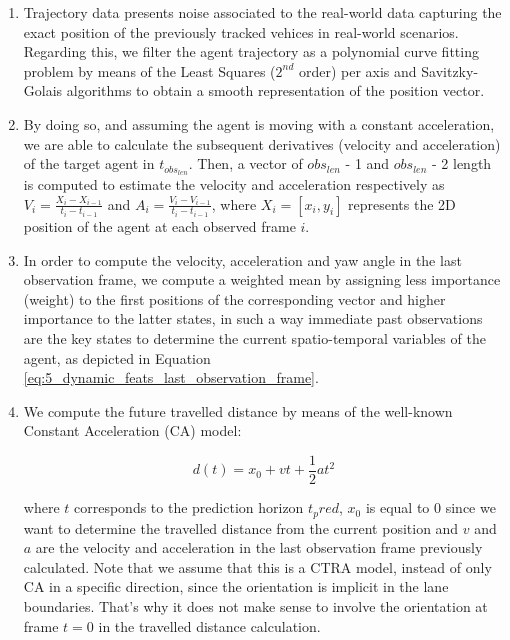 \begin{enumerate}
	\item Trajectory data presents noise associated to the real-world data capturing the exact position of the previously tracked vehices in real-world scenarios. Regarding this, we filter the agent trajectory as a polynomial curve fitting problem by means of the Least Squares ($2^{nd}$ order) per axis and Savitzky-Golais \cite{savitzky1964smoothing} algorithms to obtain a smooth representation of the position vector.
	
	\item By doing so, and assuming the agent is moving with a constant acceleration, we are able to calculate the subsequent derivatives (velocity and acceleration) of the target agent in $t_{obs_{len}}$. Then, a vector of $obs_{len}$ - 1 and $obs_{len}$ - 2 length is computed to estimate the velocity and acceleration respectively as $V_{i}=\frac{X_{i}-X_{i-1}}{t_{i}-t_{i-1}}$ and $A_{i}=\frac{V_{i}-V_{i-1}}{t_{i}-t_{i-1}}$, where $X_{i}={[x_{i},y_{i}]}$ represents the 2D position of the agent at each observed frame $i$.
	
	\item In order to compute the velocity, acceleration and yaw angle in the last observation frame, we compute a weighted mean by assigning less importance (weight) to the first positions of the corresponding vector and higher importance to the latter states, in such a way immediate past observations are the key states to determine the current spatio-temporal variables of the agent, as depicted in Equation \ref{eq:5_dynamic_feats_last_observation_frame}.
	
	\item We compute the future travelled distance by means of the well-known Constant Acceleration (CA) model:
	
	\begin{equation}
		d(t) = x_0 + vt + \frac{1}{2}at^2
	\end{equation}
	
	where $t$ corresponds to the prediction horizon $t_pred$, $x_0$ is equal to $0$ since we want to determine the travelled distance from the current position and $v$ and $a$ are the velocity and acceleration in the last observation frame previously calculated. Note that we assume that this is a \ac{CTRA} model, instead of only \ac{CA} in a specific direction, since the orientation is implicit in the lane boundaries. That's why it does not make sense to involve the orientation at frame $t=0$ in the travelled distance calculation.
	

\end{enumerate}
